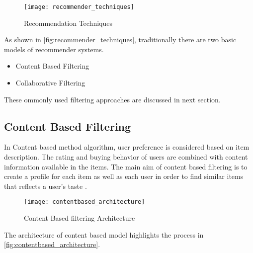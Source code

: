\begin{figure}[H]
	\centering
	\texttt{[image: recommender\_techniques]}
	\caption{Recommendation Techniques \cite{33}}
	\label{fig:recommender_techniques}
\end{figure}


\noindent As shown in \autoref{fig:recommender_techniques}, traditionally there are two basic models of recommender systems. \begin{itemize} \item Content Based Filtering \item Collaborative Filtering \end{itemize}
These ommonly used filtering approaches are discussed in next section.
\pagebreak

\subsection{Content Based Filtering}
In Content based method algorithm, user preference is considered based on item description. The rating and buying behavior of users are combined with content information available in the items. The main aim of content based filtering is to create a profile for each item as well as each user in order to find similar items that reflects a user's taste \cite{6}.
\\

\begin{figure}[H]
	\centering
	\texttt{[image: contentbased\_architecture]}
	\caption{Content Based filtering Architecture \cite{5}}
	\label{fig:contentbased_architecture}
\end{figure}

\noindent 
The architecture of content based model highlights the process in \autoref{fig:contentbased_architecture}. 


